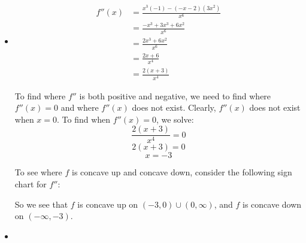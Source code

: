 \documentclass[nooutcomes]{ximera}
\begin{document}
\begin{problem}
\begin{freeResponse}
\begin{itemize}
			
			
			\item  {}
			\begin{align*}
			f''(x) &= \frac{x^3(-1) - (-x-2)(3x^2)}{x^6} \\
			&= \frac{-x^3 + 3x^3 + 6x^2}{x^6} \\
			&= \frac{2x^3 + 6x^2}{x^6} \\
			&= \frac{2x+6}{x^4} \\
			&= \frac{2(x+3)}{x^4}
			\end{align*}
			
			To find where $f''$ is both positive and negative, we need to find where $f''(x) = 0$ and where $f''(x)$ does not exist.  Clearly, $f''(x)$ does not exist when $x=0$.  To find when $f''(x) = 0$, we solve:
			$$ \frac{2(x+3)}{x^4} = 0 $$
			$$ 2(x+3) = 0 $$
			$$ x=-3 $$
			
			To see where $f$ is concave up and concave down, consider the following sign chart for $f''$:
			
		
\begin{center}
\begin{image}
\end{image}
\end{center}


			So we see that $f$ is concave up on $(-3,0) \cup (0,\infty)$, and $f$ is concave down on $(-\infty, -3)$.

			
			
			
			\item  {}  \\
			

\end{itemize}
\end{freeResponse}
\end{problem}
\end{document}

